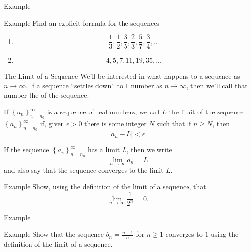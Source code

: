 \documentclass[presentation]{beamer}
\begin{document}
\begin{frame}[label={sec:org3cc7a04}]{Example}
\end{frame}

\begin{frame}[label={sec:org067ddd2}]{Example}
Find an explicit formula for the sequences
\begin{enumerate}
\item \[\frac{1}{3}, \frac{1}{2}, \frac{3}{5}, \frac{2}{3}, \frac{5}{7}, \frac{3}{4},\ldots\]
\item \[4,5,7,11,19,35,\ldots\]
\end{enumerate}
\vspace{10in}   
\end{frame}

\begin{frame}[label={sec:org70bf242}]{The Limit of a Sequence}
We'll be interested in what happens to a sequence as \(n \rightarrow
\infty.\) If a sequence ``settles down'' to 1 number as \(n \rightarrow
\infty\), then we'll call that number the \uline{\hspace*{1in}} of the sequence.

\begin{definition}
If \(\left\{ a_n \right\}_{n=n_0}^{\infty}\) is a sequence of real
numbers, we call \(L\) the \alert{limit} of the sequence \(\left\{ a_n
\right\}_{n=n_0}^{\infty}\) if, given \(\epsilon > 0\) there is some integer \(N\) such that if \(n \ge N\), then
\[
\left| a_n - L \right| < \epsilon.\]

If the sequence \(\left\{ a_n \right\}_{n=n_0}^{\infty}\) has a limit \(L\), then we write
\[
\lim_{n\rightarrow\infty} a_n = L\]
and also say that the sequence \alert{converges} to the limit \(L\).
\end{definition}
\end{frame}


\begin{frame}[label={sec:org1d125e1}]{Example}
Show, using the definition of the limit of a sequence, that
\[
\lim_{n\rightarrow\infty} \frac{1}{2^n} = 0.\]

\vspace{10in}
\end{frame}

\begin{frame}[label={sec:orgccd95f6}]{Example}
\end{frame}

\begin{frame}[label={sec:org626af4b}]{Example}
Show that the sequence \(b_n = \frac{n-1}{n}\) for \(n \ge 1\)
converges to \(1\) using the definition of the limit of a sequence.

\vspace{10in}
\end{frame}
\end{document}
